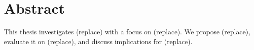 \chapter*{Abstract}

This thesis investigates (replace) with a focus on (replace). We propose (replace), evaluate it on (replace), and discuss implications for (replace).
